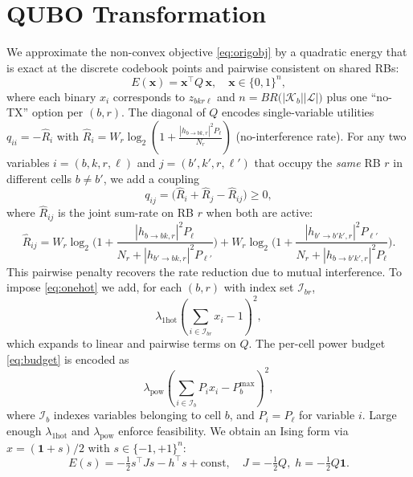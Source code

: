 \documentclass[10pt,conference]{IEEEtran}
\newcommand{\1}{\mathbf{1}}
\begin{document}
\section{QUBO Transformation}
We approximate the non-convex objective \eqref{eq:origobj} by a quadratic energy that is exact at the discrete codebook points and
pairwise consistent on shared RBs:
\begin{equation}
E(\bm{x})=\bm{x}^\top Q\,\bm{x}, \quad \bm{x}\in\{0,1\}^n,
\end{equation}
where each binary $x_i$ corresponds to $z_{bkr\ell}$ and $n=B R \big(|\mathcal{K}_b||\mathcal{L}| \big)$ plus one ``no-TX'' option per $(b,r)$.
The diagonal of $Q$ encodes single-variable utilities $q_{ii}=-\hat{R}_i$ with $\hat{R}_i=W_r\log_2\!\left(1+\frac{|h_{b\to bk,r}|^2 P_\ell}{N_r}\right)$ (no-interference rate).
For any two variables $i=(b,k,r,\ell)$ and $j=(b',k',r,\ell')$ that occupy the \emph{same} RB $r$ in different cells $b\neq b'$, we add a coupling
\begin{equation}
q_{ij} = \big(\hat{R}_i+\hat{R}_j - \hat{R}_{ij}\big) \ge 0, \label{eq:pair}
\end{equation}
where $\hat{R}_{ij}$ is the joint sum-rate on RB $r$ when both are active:
\begin{equation}
\hat{R}_{ij}= W_r \log_2\!\Big(1+\frac{|h_{b\to bk,r}|^2 P_\ell}{N_r+|h_{b'\to bk,r}|^2 P_{\ell'}}\Big)
+ W_r \log_2\!\Big(1+\frac{|h_{b'\to b'k',r}|^2 P_{\ell'}}{N_r+|h_{b \to b'k',r}|^2 P_{\ell}}\Big).
\end{equation}
This pairwise penalty recovers the rate reduction due to mutual interference.
To impose \eqref{eq:onehot} we add, for each $(b,r)$ with index set $\mathcal{I}_{br}$,
\begin{equation}
\lambda_{\text{1hot}}\left(\sum_{i\in\mathcal{I}_{br}} x_i -1\right)^2,
\end{equation}
which expands to linear and pairwise terms on $Q$. The per-cell power budget \eqref{eq:budget} is
encoded as
\begin{equation}
\lambda_{\text{pow}} \left(\sum_{i\in\mathcal{I}_b} P_i x_i - P_b^{\max}\right)^2,
\end{equation}
where $\mathcal{I}_b$ indexes variables belonging to cell $b$, and $P_i\!=\!P_\ell$ for variable $i$.
Large enough $\lambda_{\text{1hot}}$ and $\lambda_{\text{pow}}$ enforce feasibility.
We obtain an Ising form via $x=(\1+s)/2$ with $s\in\{-1,+1\}^n$:
\begin{equation}
E(s)=-\tfrac{1}{2}s^\top J s - h^\top s + \text{const},\quad J=-\tfrac{1}{2}Q,\; h=-\tfrac{1}{2}Q\1.
\end{equation}
\end{document}
